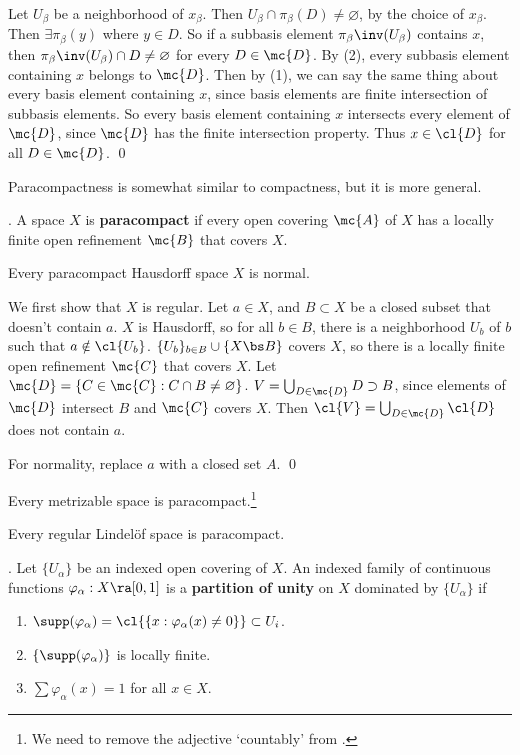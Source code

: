 Let \(U_\beta\) be a neighborhood of \(x_\beta\). Then \(U_\beta \cap \pi_\beta (D) \neq \varnothing\), by the choice of \(x_\beta\). Then \(\exists \pi_\beta(y)\) where \(y \in D\). So if a subbasis element \(\pi_\beta\inv(U_\beta)\) contains \(x\), then \(\pi_\beta\inv(U_\beta) \cap D \neq \varnothing\) for every \(D \in \mc{D}\). By  (2), every subbasis element containing \(x\) belongs to \(\mc{D}\). Then by  (1), we can say the same thing about every basis element containing \(x\), since basis elements are finite intersection of subbasis elements. So every basis element containing \(x\) intersects every element of \(\mc{D}\), since \(\mc{D}\) has the finite intersection property. Thus \(x \in \cl{D}\) for all \(D \in \mc{D}\). \qed

\pagebreak

\setcounter{topic}{40}

Paracompactness is somewhat similar to compactness, but it is more general.

.  A space \(X\) is \textbf{paracompact} if every open covering \(\mc{A}\) of \(X\) has a locally finite open refinement \(\mc{B}\) that covers \(X\).

 Every paracompact Hausdorff space \(X\) is normal.

\pf We first show that \(X\) is regular. Let \(a \in X\), and \(B \subset X\) be a closed subset that doesn't contain \(a\). \(X\) is Hausdorff, so for all \(b \in B\), there is a neighborhood \(U_b\) of \(b\) such that \(a \notin \cl{U_b}\). \(\{U_b\}_{b \in B} \cup \{X \bs B\}\) covers \(X\), so there is a locally finite open refinement \(\mc{C}\) that covers \(X\). Let \(\mc{D} = \{C \in \mc{C} : C \cap B \neq \varnothing\}\). \(V = \bigcup_{D \in \mc{D}} D \supset B\), since elements of \(\mc{D}\) intersect \(B\) and \(\mc{C}\) covers \(X\). Then \(\cl{V} = \bigcup_{D \in \mc{D}} \cl{D}\) does not contain \(a\).

For normality, replace \(a\) with a closed set \(A\). \qed

 Every metrizable space is paracompact.\footnote{We need to remove the adjective `countably' from .}

 Every regular Lindelöf space is paracompact.

. Let \(\{U_\alpha\}\) be an indexed open covering of \(X\). An indexed family of continuous functions \(\varphi_\alpha : X \ra [0, 1]\) is a \textbf{partition of unity} on \(X\) dominated by \(\{U_\alpha\}\) if
\begin{enumerate}
    \item \(\supp(\varphi_\alpha) = \cl{\{x : \varphi_\alpha(x) \neq 0\}} \subset U_i\).
    \item \(\{\supp(\varphi_\alpha)\}\) is locally finite.
    \item \(\sum \varphi_\alpha(x) = 1\) for all \(x \in X\).
\end{enumerate}

